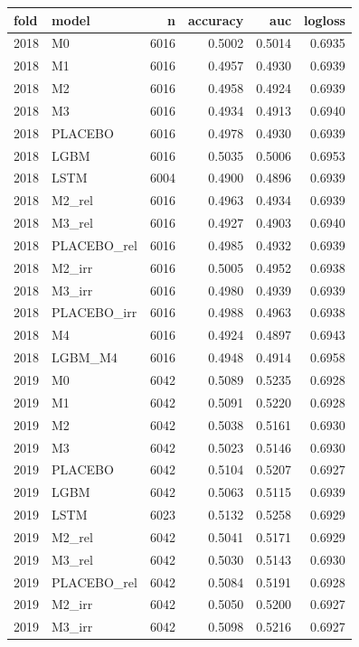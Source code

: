 \begin{tabular}{llrrrr}
\toprule
fold & model & n & accuracy & auc & logloss \\
\midrule
2018 & M0 & 6016 & 0.5002 & 0.5014 & 0.6935 \\
2018 & M1 & 6016 & 0.4957 & 0.4930 & 0.6939 \\
2018 & M2 & 6016 & 0.4958 & 0.4924 & 0.6939 \\
2018 & M3 & 6016 & 0.4934 & 0.4913 & 0.6940 \\
2018 & PLACEBO & 6016 & 0.4978 & 0.4930 & 0.6939 \\
2018 & LGBM & 6016 & 0.5035 & 0.5006 & 0.6953 \\
2018 & LSTM & 6004 & 0.4900 & 0.4896 & 0.6939 \\
2018 & M2\_rel & 6016 & 0.4963 & 0.4934 & 0.6939 \\
2018 & M3\_rel & 6016 & 0.4927 & 0.4903 & 0.6940 \\
2018 & PLACEBO\_rel & 6016 & 0.4985 & 0.4932 & 0.6939 \\
2018 & M2\_irr & 6016 & 0.5005 & 0.4952 & 0.6938 \\
2018 & M3\_irr & 6016 & 0.4980 & 0.4939 & 0.6939 \\
2018 & PLACEBO\_irr & 6016 & 0.4988 & 0.4963 & 0.6938 \\
2018 & M4 & 6016 & 0.4924 & 0.4897 & 0.6943 \\
2018 & LGBM\_M4 & 6016 & 0.4948 & 0.4914 & 0.6958 \\
2019 & M0 & 6042 & 0.5089 & 0.5235 & 0.6928 \\
2019 & M1 & 6042 & 0.5091 & 0.5220 & 0.6928 \\
2019 & M2 & 6042 & 0.5038 & 0.5161 & 0.6930 \\
2019 & M3 & 6042 & 0.5023 & 0.5146 & 0.6930 \\
2019 & PLACEBO & 6042 & 0.5104 & 0.5207 & 0.6927 \\
2019 & LGBM & 6042 & 0.5063 & 0.5115 & 0.6939 \\
2019 & LSTM & 6023 & 0.5132 & 0.5258 & 0.6929 \\
2019 & M2\_rel & 6042 & 0.5041 & 0.5171 & 0.6929 \\
2019 & M3\_rel & 6042 & 0.5030 & 0.5143 & 0.6930 \\
2019 & PLACEBO\_rel & 6042 & 0.5084 & 0.5191 & 0.6928 \\
2019 & M2\_irr & 6042 & 0.5050 & 0.5200 & 0.6927 \\
2019 & M3\_irr & 6042 & 0.5098 & 0.5216 & 0.6927 \\

\end{tabular}

